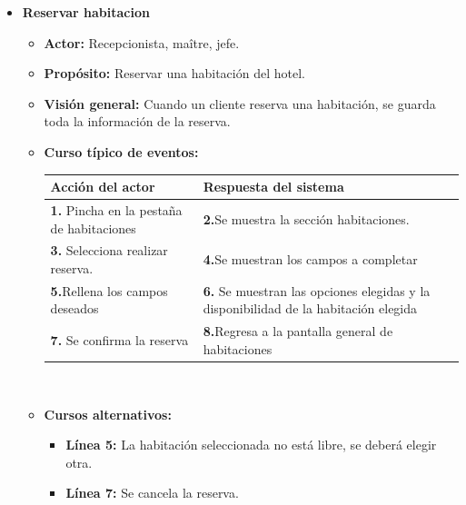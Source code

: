 \documentclass[spanish,a4paper,12pt]{report}		%
\begin{document}
\begin{itemize}
	\item \textbf{Reservar habitacion}
		\begin{itemize}
			\item \textbf{Actor:} Recepcionista, maître, jefe.
			\item \textbf{Propósito: } Reservar una habitación del hotel.
			\item \textbf{Visión general:} Cuando un cliente reserva una habitación, se guarda toda la información de la reserva.
			\item \textbf{Curso típico de eventos:} 	\\
				\begin{tabular}{|p{6cm}||p{6cm}|}
				\hline
				\textbf{Acción del actor} & \textbf{Respuesta del sistema} \\ \hline
				\textbf{1.} Pincha en la pestaña de habitaciones & \textbf{2.}Se muestra la sección habitaciones.\\ \hline 
				\textbf{3.} Selecciona realizar reserva. & \textbf{4.}Se muestran los campos a completar  \\ \hline
				\textbf{5.}Rellena los campos deseados & \textbf{6.} Se muestran las opciones elegidas y la disponibilidad de la habitación elegida \\ \hline
				\textbf{7.} Se confirma la reserva & \textbf{8.}Regresa a la pantalla general de habitaciones\\ \hline
			\end{tabular}
			\\
			\item \textbf{Cursos alternativos:} 
			\begin{itemize}
			\item  \textbf{Línea 5:} La habitación seleccionada no está libre, se deberá elegir otra.
			\item  \textbf{Línea 7:} Se cancela la reserva. \\
			\end {itemize}
		\end {itemize}


\end{itemize}
\end{document}
